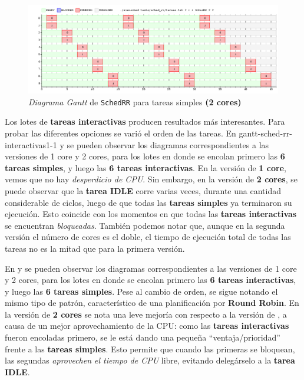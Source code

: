 \documentclass[11pt, a4paper, twoside]{article}
\begin{document}
\begin{figure}
  \centering
  \includegraphics [width=\textwidth]{../graficos/sched_rr/simples-2.png}
  \caption{\emph{Diagrama Gantt} de \texttt{SchedRR} para tareas simples \textbf{(2 cores)}}
  \label{fig:gantt-sched-rr-2}
\end{figure}

Los lotes de \textbf{tareas interactivas} producen resultados más interesantes.
Para probar las diferentes opciones se varió el orden de las tareas. En \fig
{gantt-sched-rr-interactivas1-1} y  se
pueden observar los diagramas correspondientes a las versiones de 1 core y 2
cores, para los lotes en donde se encolan primero las \textbf{6 tareas simples},
y luego las \textbf{6 tareas interactivas}. En la versión de \textbf{1 core},
vemos que no hay \emph{desperdicio de CPU}. Sin embargo, en la versión de
\textbf{2 cores}, se puede observar que la \textbf{tarea IDLE} corre varias
veces, durante una cantidad considerable de ciclos, luego de que todas las
\textbf{tareas simples} ya terminaron su ejecución. Esto coincide con los
momentos en que todas las \textbf{tareas interactivas} se encuentran
\emph{bloqueadas}. También podemos notar que, aunque en la segunda versión el
número de cores es el doble, el tiempo de ejecución total de todas las tareas no
es la mitad que para la primera versión.

En  y 
se pueden observar los diagramas correspondientes a las versiones de 1 core y 2
cores, para los lotes en donde se encolan primero las \textbf{6 tareas
interactivas}, y luego las \textbf{6 tareas simples}. Pese al cambio de orden,
se sigue notando el mismo tipo de patrón, característico de una planificación
por \textbf{Round Robin}. En la versión de \textbf{2 cores} se nota una leve
mejoría con respecto a la versión de , a
causa de un mejor aprovechamiento de la CPU: como las \textbf{tareas
interactivas} fueron encoladas primero, se le está dando una pequeña
``ventaja/prioridad'' frente a las \textbf{tareas simples}. Esto permite que
cuando las primeras se bloquean, las segundas \emph{aprovechen el tiempo de
CPU} libre, evitando delegárselo a la \textbf{tarea IDLE}.
\end{document}

